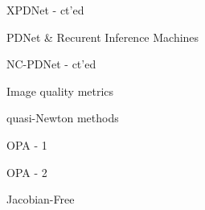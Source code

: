 \begin{frame}{XPDNet - ct'ed}
    
\end{frame}

\begin{frame}{PDNet \& Recurent Inference Machines}
    
\end{frame}

\begin{frame}{NC-PDNet - ct'ed}
    
\end{frame}

\begin{frame}{Image quality metrics}
    
\end{frame}

\begin{frame}{quasi-Newton methods}
    
\end{frame}

\begin{frame}{OPA - 1}
    
\end{frame}

\begin{frame}{OPA - 2}
    
\end{frame}

\begin{frame}{Jacobian-Free}
    
\end{frame}